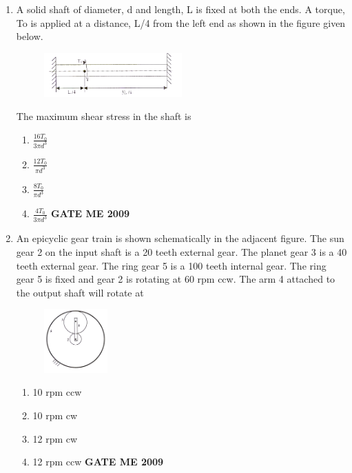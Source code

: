 \documentclass[journal]{IEEEtran}
\begin{document}
\begin{enumerate}[leftmargin=0pt]
\item A solid shaft of diameter, d and length, L is fixed at both the ends. A torque, To is applied at a distance,
L/4 from the left end as shown in the figure given below.


\begin{figure}[h]
  \centering
  \includegraphics[width=0.5\textwidth]{Figs/image (7).png}
  \caption{}
\end{figure}

The maximum shear stress in the shaft is

\begin{enumerate}[label=(\Alph*)]
  \item $\frac{16T_0}{3\pi d^3}$
  \item $\frac{12T_0}{\pi d^3}$
  \item $\frac{8T_0}{\pi d^3}$
  \item $\frac{4T_0}{3\pi d^3}$
\hfill{\textbf{GATE ME 2009}}
\end{enumerate}




\item An epicyclic gear train is shown schematically in the adjacent figure. The sun gear 2 on the input shaft is a 20 teeth external gear. The planet gear 3 is a 40 teeth external gear. The ring gear 5 is a 100 teeth internal gear. The ring gear 5 is fixed and gear 2 is rotating at 60 rpm ccw. The arm 4 attached to the output shaft will rotate at
\begin{figure}[h] 
  \centering
  \includegraphics[width=0.23\textwidth]{Figs/image (8).png}
  \caption{}
\end{figure}

\begin{enumerate}[label=(\Alph*)]
  \item 10 rpm ccw
  \item 10 rpm cw
  \item 12 rpm cw
  \item 12 rpm ccw
\hfill{\textbf{GATE ME 2009}}
\end{enumerate}


\end{enumerate}
\end{document}
